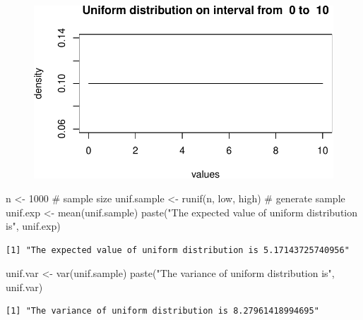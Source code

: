 \documentclass[
  letterpaper,
  DIV=11,
  numbers=noendperiod]{scrreprt}
\newenvironment{Shaded}{\begin{snugshade}}{\end{snugshade}}
\newcommand{\CommentTok}[1]{\textcolor[rgb]{0.37,0.37,0.37}{#1}}
\newcommand{\DecValTok}[1]{\textcolor[rgb]{0.68,0.00,0.00}{#1}}
\newcommand{\FunctionTok}[1]{\textcolor[rgb]{0.28,0.35,0.67}{#1}}
\newcommand{\NormalTok}[1]{\textcolor[rgb]{0.00,0.23,0.31}{#1}}
\newcommand{\OtherTok}[1]{\textcolor[rgb]{0.00,0.23,0.31}{#1}}
\newcommand{\StringTok}[1]{\textcolor[rgb]{0.13,0.47,0.30}{#1}}
\begin{document}
\begin{figure}[H]

{\centering \includegraphics{./04-distributions_files/figure-pdf/unnamed-chunk-9-1.pdf}

}

\end{figure}

\begin{Shaded}
\begin{Highlighting}[]
\NormalTok{n }\OtherTok{\textless{}{-}} \DecValTok{1000} \CommentTok{\# sample size}
\NormalTok{unif.sample }\OtherTok{\textless{}{-}} \FunctionTok{runif}\NormalTok{(n, low, high) }\CommentTok{\# generate sample}
\NormalTok{unif.exp }\OtherTok{\textless{}{-}} \FunctionTok{mean}\NormalTok{(unif.sample)}
\FunctionTok{paste}\NormalTok{(}\StringTok{"The expected value of uniform distribution is"}\NormalTok{, unif.exp)}
\end{Highlighting}
\end{Shaded}

\begin{verbatim}
[1] "The expected value of uniform distribution is 5.17143725740956"
\end{verbatim}

\begin{Shaded}
\begin{Highlighting}[]
\NormalTok{unif.var }\OtherTok{\textless{}{-}} \FunctionTok{var}\NormalTok{(unif.sample)}
\FunctionTok{paste}\NormalTok{(}\StringTok{"The variance of uniform distribution is"}\NormalTok{, unif.var)}
\end{Highlighting}
\end{Shaded}

\begin{verbatim}
[1] "The variance of uniform distribution is 8.27961418994695"
\end{verbatim}
\end{document}
